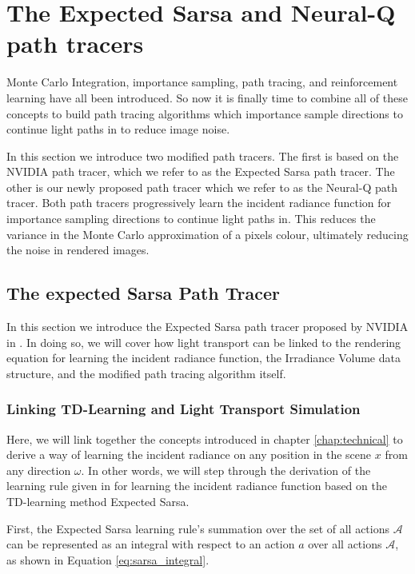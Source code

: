 \documentclass[../dissertation.tex]{subfiles}
\begin{document}
\chapter{The Expected Sarsa and Neural-Q path tracers}
\label{chap:td_deep_sampling}

Monte Carlo Integration, importance sampling, path tracing, and reinforcement learning have all been introduced. So now it is finally time to combine all of these concepts to build path tracing algorithms which importance sample directions to continue light paths in to reduce image noise.

In this section we introduce two modified path tracers. The first is based on the NVIDIA path tracer, which we refer to as the Expected Sarsa path tracer. The other is our newly proposed path tracer which we refer to as the Neural-Q path tracer. Both path tracers progressively learn the incident radiance function for importance sampling directions to continue light paths in. This reduces the variance in the Monte Carlo approximation of a pixels colour, ultimately reducing the noise in rendered images. 

\section{The expected Sarsa Path Tracer}
\label{sec:expecte_sarsa_path_tracer}

In this section we introduce the Expected Sarsa path tracer proposed by NVIDIA in \cite{dahm2017learning}. In doing so, we will cover how light transport can be linked to the rendering equation for learning the incident radiance function, the Irradiance Volume data structure, and the modified path tracing algorithm itself.

\subsection{Linking TD-Learning and Light Transport Simulation}
\label{sec:td_light_transport}
Here, we will  link together the concepts introduced in chapter \ref{chap:technical} to derive a way of learning the incident radiance on any position in the scene $x$ from any direction $\omega$. In other words, we will step through the derivation of the learning rule given in \cite{dahm2017learning} for learning the incident radiance function based on the TD-learning method Expected Sarsa.

First, the Expected Sarsa learning rule's summation over the set of all actions $\mathcal{A}$ can be represented as an integral with respect to an action $a$ over all actions $\mathcal{A}$, as shown in Equation \ref{eq:sarsa_integral}.
\end{document}
